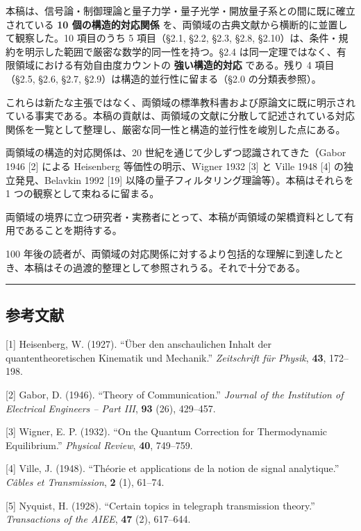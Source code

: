 \documentclass[
]{ltjsarticle}
\begin{document}
本稿は、信号論・制御理論と量子力学・量子光学・開放量子系との間に既に確立されている
\textbf{10 個の構造的対応関係}
を、両領域の古典文献から横断的に並置して観察した。10 項目のうち 5
項目（§2.1, §2.2, §2.3, §2.8,
§2.10）は、条件・規約を明示した範囲で厳密な数学的同一性を持つ。§2.4
は同一定理ではなく、有限領域における有効自由度カウントの
\textbf{強い構造的対応} である。残り 4 項目（§2.5, §2.6, §2.7,
§2.9）は構造的並行性に留まる（§2.0 の分類表参照）。

これらは新たな主張ではなく、両領域の標準教科書および原論文に既に明示されている事実である。本稿の貢献は、両領域の文献に分散して記述されている対応関係を一覧として整理し、厳密な同一性と構造的並行性を峻別した点にある。

両領域の構造的対応関係は、20 世紀を通じて少しずつ認識されてきた（Gabor
1946 {[}2{]} による Heisenberg 等価性の明示、Wigner 1932 {[}3{]} と
Ville 1948 {[}4{]} の独立発見、Belavkin 1992 {[}19{]}
以降の量子フィルタリング理論等）。本稿はそれらを 1
つの観察として束ねるに留まる。

両領域の境界に立つ研究者・実務者にとって、本稿が両領域の架橋資料として有用であることを期待する。

100
年後の読者が、両領域の対応関係に対するより包括的な理解に到達したとき、本稿はその過渡的整理として参照されうる。それで十分である。

\begin{center}\rule{0.5\linewidth}{0.5pt}\end{center}

\subsection{参考文献}\label{ux53c2ux8003ux6587ux732e}

{[}1{]} Heisenberg, W. (1927). ``Über den anschaulichen Inhalt der
quantentheoretischen Kinematik und Mechanik.'' \emph{Zeitschrift für
Physik}, \textbf{43}, 172--198.

{[}2{]} Gabor, D. (1946). ``Theory of Communication.'' \emph{Journal of
the Institution of Electrical Engineers -- Part III}, \textbf{93} (26),
429--457.

{[}3{]} Wigner, E. P. (1932). ``On the Quantum Correction for
Thermodynamic Equilibrium.'' \emph{Physical Review}, \textbf{40},
749--759.

{[}4{]} Ville, J. (1948). ``Théorie et applications de la notion de
signal analytique.'' \emph{Câbles et Transmission}, \textbf{2} (1),
61--74.

{[}5{]} Nyquist, H. (1928). ``Certain topics in telegraph transmission
theory.'' \emph{Transactions of the AIEE}, \textbf{47} (2), 617--644.
\end{document}
